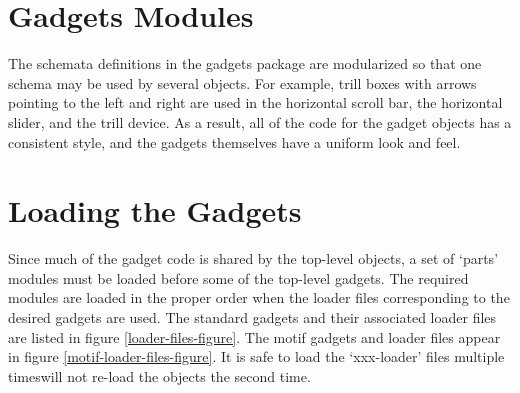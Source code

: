 \section{Gadgets Modules} The schemata definitions in the gadgets
package are modularized so that one schema may be used by several
objects.  For example, trill boxes with arrows pointing to the left
and right are used in the horizontal scroll bar, the horizontal
slider, and the trill device.  As a result, all of the code for the
gadget objects has a consistent style, and the gadgets themselves have
a uniform look and feel.


\section{Loading the Gadgets}

Since much of the gadget code is shared
by the top-level objects, a set of `parts' modules must be loaded
before some of the top-level gadgets.  The required modules are loaded
in the proper order when the loader files corresponding to the desired
gadgets are used.  The standard gadgets and their associated loader
files are listed in figure \ref{loader-files-figure}.  The motif
gadgets and loader files appear in figure
\ref{motif-loader-files-figure}.  It is safe to load the
`xxx-loader' files multiple times\dashthey will not re-load the
objects the second time.

